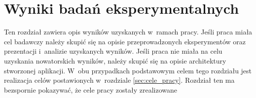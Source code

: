 \chapter{Wyniki badań eksperymentalnych}\label{chap:badania}
Ten rozdział zawiera opis wyników uzyskanych w~ramach pracy. Jeśli praca miała cel badawczy należy skupić się na opisie przeprowadzonych eksperymentów oraz prezentacji i~analizie uzyskanych wyników. Jeśli praca nie miała na celu uzyskania nowatorskich wyników, należy skupić się na opisie architektury stworzonej aplikacji. W~obu przypadkach podstawowym celem tego rozdziału jest realizacja celów postawionych w~rozdziale \ref{sec:cele_pracy}. Rozdział ten ma bezspornie pokazywać, że cele pracy zostały zrealizowane
